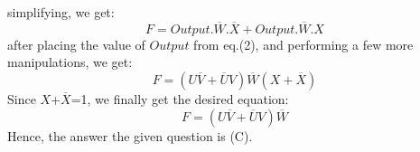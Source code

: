 \documentclass{article}
\begin{document}
simplifying, we get:
\begin{equation}
    F = Output.\overline{W}.\overline{X} + Output.\overline{W}.X
\end{equation}
after placing the value of $Output$ from eq.(2), and performing a few more manipulations, we get:
\begin{equation}
    F = (U\overline{V}+\overline{U}V)\overline{W}(X+\overline{X})
\end{equation}
\hspace{0.5cm}
Since $X$+$\overline{X}$=1, we finally get the desired equation:
\begin{equation}
    F = (U\overline{V}+\overline{U}V)\overline{W}
\end{equation}
Hence, the answer the given question is (C).

\vspace{5cm}
\end{document}
